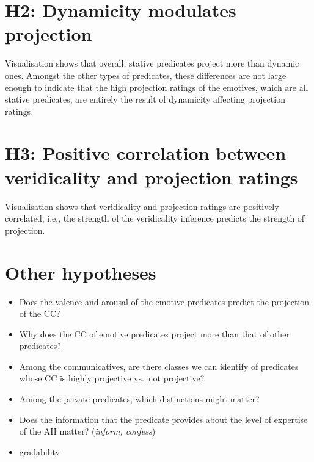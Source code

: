 \documentclass[11pt,fleqn]{article}
\newcommand{\6}{\mbox{$[\hspace*{-.6mm}[$}}
\newcommand{\9}{\mbox{$]\hspace*{-.6mm}]$}}
\begin{document}
\section{H2: Dynamicity modulates projection}

Visualisation shows that overall, stative predicates project more than dynamic ones. Amongst the other types of predicates, these differences are not large enough to indicate that the high projection ratings of the emotives, which are all stative predicates, are entirely the result of dynamicity affecting projection ratings. 

\section{H3: Positive correlation between veridicality and projection ratings}

Visualisation shows that veridicality and projection ratings are positively correlated, i.e., the strength of the veridicality inference predicts the strength of projection. 


\section{Other hypotheses}
\begin{itemize}

\item Does the valence and arousal of the emotive predicates predict the projection of the CC?

\item Why does the CC of emotive predicates project more than that of other predicates? 

\item Among the communicatives, are there classes we can identify of predicates whose CC is highly projective vs.\ not projective?

\item Among the private predicates, which distinctions might matter?

\item Does the information that the predicate provides about the level of expertise of the AH matter? ({\em inform, confess})

\item gradability

\end{itemize}




\end{document}
